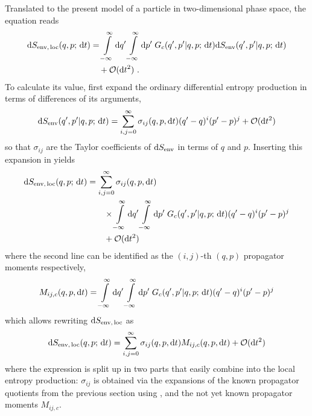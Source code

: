 Translated to the present model of a particle in two-dimensional phase space, the equation reads
%
\begin{equation}\begin{split}
	\label{eqn:local entropy 1d}
	\mathrm{d}S_\text{env,\,loc}(q,p;\,\mathrm{d} t) &= \int\limits_{-\infty}^\infty\mathrm{d} q'\int\limits_{-\infty}^\infty\mathrm{d} p'\; G_c(q',p'|q,p;\,\mathrm{d} t) \mathrm{d}S_\text{env}(q',p'|q,p;\,\mathrm{d} t)
	\\&\quad + \mathcal{O}(\mathrm{d} t^2) ~.
\end{split}\end{equation}
%
To calculate its value, first expand the ordinary differential entropy production in terms of differences of its arguments,
%
\begin{equation}
	\label{eqn:dSEnv power expansion}
	\mathrm{d}S_\text{env}(q',p'|q,p;\,\mathrm{d} t)
	= \sum_{i,j=0}^\infty
	\sigma_{ij}(q,p,\mathrm{d} t)
	(q'-q)^i
	(p'-p)^j
	+ \mathcal{O}(\mathrm{d} t^2)
\end{equation}
%
so that \(\sigma_{ij}\) are the Taylor coefficients of \(\mathrm{d}S_\text{env}\) in terms of \(q\) and \(p\). Inserting this expansion in  yields
%
\begin{equation}\begin{split}
	\mathrm{d}S_\text{env,\,loc}(q,p;\,\mathrm{d} t) &=
	\sum_{i,j=0}^\infty
	\sigma_{ij}(q,p,\mathrm{d} t)
	\\&\qquad
	\times\int\limits_{-\infty}^\infty\mathrm{d} q'
	\int\limits_{-\infty}^\infty\mathrm{d} p'
	\; G_c(q',p'|q,p;\,\mathrm{d} t)
	(q'-q)^i
	(p'-p)^j
	\\&\qquad + \mathcal{O}(\mathrm{d} t^2)
\end{split}\end{equation}
%
where the second line can be identified as the \((i,j)\)-th \((q,p)\) propagator moments respectively,
%
\begin{equation}
	M_{ij,c}(q,p,\mathrm{d} t) = 
	\int\limits_{-\infty}^\infty\mathrm{d} q'
	\int\limits_{-\infty}^\infty\mathrm{d} p'
	\; G_c(q',p'|q,p;\,\mathrm{d} t)
	(q'-q)^i
	(p'-p)^j
\end{equation}
%
which allows rewriting \(\mathrm{d}S_\text{env,\,loc}\) as
%
\begin{equation}
	\label{eqn:dSEnvLoc split up}
	\mathrm{d}S_\text{env,\,loc}(q,p;\,\mathrm{d} t)
	=
	\sum_{i,j=0}^\infty
	\sigma_{ij}(q,p,\mathrm{d} t)
	M_{ij,c}(q,p,\mathrm{d} t)
	+ \mathcal{O}(\mathrm{d} t^2)
\end{equation}
%
where the expression is split up in two parts that easily combine into the local entropy production: \(\sigma_{ij}\) is obtained via the expansions of the known propagator quotients from the previous section using , and the not yet known propagator moments \(M_{ij,c}\).



